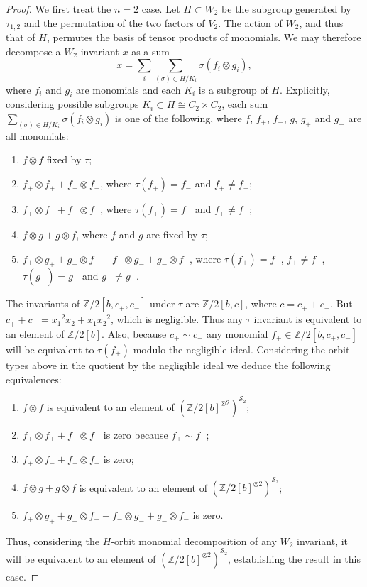 \documentclass{article}
\theoremstyle{plain}
\theoremstyle{definition}
\newcommand{\Z}{\mathbb{Z}}
\newcommand{\si}{\mathcal{S}}
\begin{document}
\begin{proof}
    We first treat the $n=2$ case.  Let $H \subset W_2$ be the subgroup generated by $\tau_{1,2}$ and the permutation of the two factors of $V_2$.   
    The action of $W_2$, and thus that of $H$, permutes the basis of tensor products of monomials.  We may therefore decompose a $W_2$-invariant $x$ as a sum 
    $$x = \sum_i \sum_{(\sigma) \in H/K_i} \sigma (f_i \otimes g_i),$$
    where $f_i$ and $g_i$ are monomials and 
    each $K_i$ is a subgroup of $H$.
      Explicitly, considering possible subgroups $K_i \subset H \cong C_2 \times C_2$, each sum
      $\sum_{(\sigma) \in H/K_i} \sigma (f_i \otimes g_i)$ is one of the following, where $f$, $f_+$, $f_-$, $g$, $g_+$ and $g_-$ are all monomials:
\begin{enumerate}
    \item $f \otimes f$ fixed by $\tau$;
    \item $f_+ \otimes f_+ + f_- \otimes f_-$, where $\tau(f_+) = f_-$ and $f_+ \neq f_-$;
    \item $f_+ \otimes f_- + f_- \otimes f_+$, where $\tau(f_+) = f_-$ and $f_+ \neq f_-$;
    \item $f \otimes g + g \otimes f$, where $f$ and $g$ are fixed by $\tau$;
    \item $f_+ \otimes g_+ + g_+ \otimes f_+ + f_- \otimes g_- 
    + g_- \otimes f_-$, where  $\tau(f_+) = f_-$, $f_+ \neq f_-$,$\tau(g_+) = g_-$ and $g_+ \neq g_-$.
\end{enumerate}
The invariants of $\Z/2[b,c_+,c_-]$ under $\tau$ are $\Z/2[b,c]$, where $c = c_+ + c_-$.  But  $c_+ +  c_- = {x_1}^2 x_2 + x_1 {x_2}^2$, which is negligible.  Thus any $\tau$ invariant is equivalent to an element of $\Z/2[b]$.  
Also, because $c_+ \sim c_-$  any monomial $f_+ \in \Z/2[b, c_+, c_-]$ will be equivalent to $\tau(f_+)$ modulo the negligible ideal.  Considering the orbit types above in the quotient by the negligible ideal we deduce
the following equivalences:
\begin{enumerate}
    \item $f \otimes f$ is equivalent to an element of $(\Z/2[b]^{\otimes 2})^{\si_2}$;
    \item $f_+ \otimes f_+ + f_- \otimes f_-$ is zero  because $f_+ \sim f_-$;
    \item $f_+ \otimes f_- + f_- \otimes f_+$ is zero;
    \item $f \otimes g + g \otimes f$ is equivalent to an element of $(\Z/2[b]^{\otimes 2})^{\si_2}$;
    \item $f_+ \otimes g_+ + g_+ \otimes f_+ + f_- \otimes g_- 
    + g_- \otimes f_-$ is zero.
\end{enumerate}
Thus, considering the $H$-orbit monomial decomposition of any $W_2$ invariant, it will be equivalent to an element of $(\Z/2[b]^{\otimes 2})^{\si_2}$, establishing the result in this case.



\end{proof}
\end{document}

